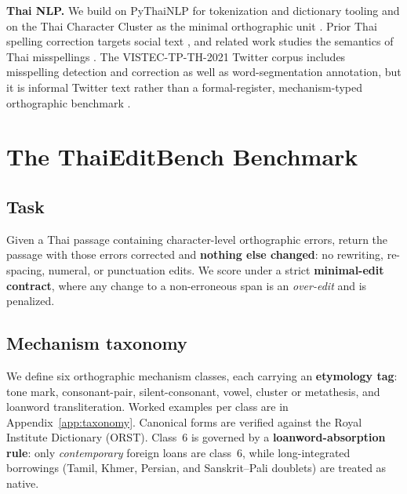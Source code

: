 \documentclass[11pt]{article}
\begin{document}
\noindent\textbf{Thai NLP.} We build on PyThaiNLP for tokenization and dictionary tooling
\citep{phatthiyaphaibun-etal-2023-pythainlp} and on the Thai Character Cluster as the minimal
orthographic unit \citep{theeramunkong-etal-2000-character}. Prior Thai spelling correction
targets social text \citep{lertpiya-etal-2020-thai,lertpiya-etal-2023-progressively}, and
related work studies the semantics of Thai misspellings
\citep{nakwijit-purver-2022-misspelling}. The VISTEC-TP-TH-2021 Twitter corpus includes
misspelling detection and correction as well as word-segmentation annotation, but it is
informal Twitter text rather than a formal-register, mechanism-typed orthographic benchmark
\citep{limkonchotiwat-etal-2021-handling}.

\section{The ThaiEditBench Benchmark}

\subsection{Task}
Given a Thai passage containing character-level orthographic errors, return the passage with
those errors corrected and \textbf{nothing else changed}: no rewriting, re-spacing, numeral,
or punctuation edits. We score under a strict \textbf{minimal-edit contract}, where any change
to a non-erroneous span is an \emph{over-edit} and is penalized.

\subsection{Mechanism taxonomy}
We define six orthographic mechanism classes, each carrying an \textbf{etymology tag}: tone
mark, consonant-pair, silent-consonant, vowel, cluster or metathesis, and loanword
transliteration. Worked examples per class are in Appendix~\ref{app:taxonomy}. Canonical forms
are verified against the Royal Institute Dictionary (ORST). Class~6 is governed by a
\textbf{loanword-absorption rule}: only \emph{contemporary} foreign loans are class~6, while
long-integrated borrowings (Tamil, Khmer, Persian, and Sanskrit--Pali doublets) are treated as
native.
\end{document}
